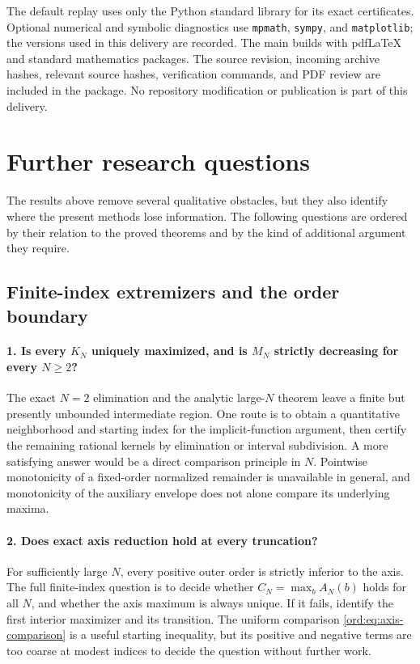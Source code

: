 The default replay uses only the Python standard library for its exact
certificates. Optional numerical and symbolic diagnostics use
\texttt{mpmath}, \texttt{sympy}, and \texttt{matplotlib}; the versions
used in this delivery are recorded. The main 
builds with pdfLaTeX and standard mathematics packages.
The source revision, incoming archive hashes, relevant source hashes,
verification commands, and PDF review are included in the package.
No repository modification or publication is part of this delivery.

\section{Further research questions}
\label{sec:research}

The results above remove several qualitative obstacles, but they also
identify where the present methods lose information. The following
questions are ordered by their relation to the proved theorems and by
the kind of additional argument they require.

\subsection{Finite-index extremizers and the order boundary}

\paragraph{1. Is every $K_N$ uniquely maximized, and is $M_N$ strictly
decreasing for every $N\ge2$?}
The exact $N=2$ elimination and the analytic large-$N$ theorem leave
a finite but presently unbounded intermediate region. One route is
to obtain a quantitative neighborhood and starting index for the
implicit-function argument, then certify the remaining rational
kernels by elimination or interval subdivision. A more satisfying
answer would be a direct comparison principle in $N$.
Pointwise monotonicity of a fixed-order normalized remainder is
unavailable in general, and monotonicity of the auxiliary envelope
does not alone compare its underlying maxima.

\paragraph{2. Does exact axis reduction hold at every truncation?}
For sufficiently large $N$, every positive outer order is strictly
inferior to the axis. The full finite-index question is to decide
whether $C_N=\max_b A_N(b)$ holds for all $N$, and whether the
axis maximum is always unique. If it fails, identify the first
interior maximizer and its transition. The uniform comparison
\eqref{ord:eq:axis-comparison} is a useful starting inequality, but
its positive and negative terms are too coarse at modest indices
to decide the question without further work.

